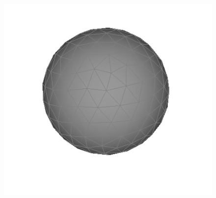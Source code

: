 \documentclass{beamer}
\begin{document}
\begin{frame}
\begin{figure}
        \includegraphics[scale=0.2]{img/sphere-polyhedron-200}
    \end{figure}
\end{frame}
\end{document}
